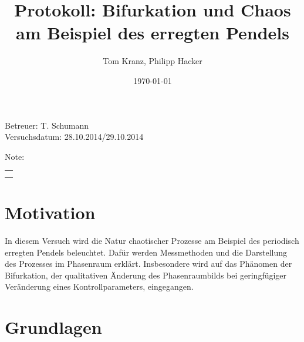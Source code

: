 \documentclass[numbers=noenddot,12pt,a4paper]{scrartcl}
\title{Protokoll: Bifurkation und Chaos am Beispiel des erregten Pendels}
\author{Tom Kranz, Philipp Hacker}
\date{\today}
\begin{document}
\maketitle
\begin{center}
Betreuer: T. Schumann \\
Versuchsdatum: 28.10.2014/29.10.2014 \\
\begin{table}[h]
\centering
Note: %
\begin{tabularx}{1.5cm}{|X|}
\hline \\ \\
\hline
\end{tabularx}
\end{table}
\end{center}
\vspace*{\fill}
\tableofcontents
\vfill
\newpage
\section{Motivation}
In diesem Versuch wird die Natur chaotischer Prozesse am Beispiel des periodisch erregten Pendels beleuchtet. Dafür werden Messmethoden und die Darstellung des Prozesses im Phasenraum erklärt. Insbesondere wird auf das Phänomen der Bifurkation, der qualitativen Änderung des Phasenraumbilds bei geringfügiger Veränderung eines Kontrollparameters, eingegangen.
\section{Grundlagen}
\end{document}
